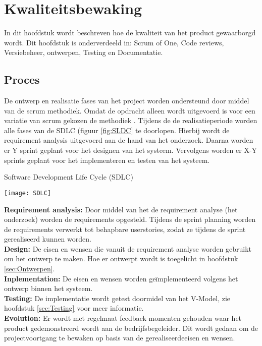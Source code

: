 \chapter{Kwaliteitsbewaking}
In dit hoofdstuk wordt beschreven hoe de kwaliteit van het product gewaarborgd wordt.
Dit hoofdstuk is onderverdeeld in: Scrum of One, Code reviews, Versiebeheer, ontwerpen, Testing en Documentatie.
\section{Proces}
De ontwerp en realisatie fases van het project worden ondersteund door middel van de scrum methodiek.
Omdat de opdracht alleen wordt uitgevoerd is voor een variatie van scrum gekozen de  methodiek \Parencite{ScrumOfOne}.
\whitespace
Tijdens de de realisatieperiode worden alle fases van de SDLC (figuur \ref{fig:SLDC} te doorlopen.
Hierbij wordt de requirement analysis uitgevoerd aan de hand van het onderzoek.
Daarna worden er Y sprint geplant voor het designen van het systeem.
Vervolgens worden er X-Y sprints geplant voor het implementeren en testen van het systeem. \\
\begin{graphic}
    \captionsetup{type=figure}
    \caption{Software Development Life Cycle (SDLC)}
    \texttt{[image: SDLC]}
    \label{fig:SLDC}
\end{graphic}
\whitespace
\textbf{Requirement analysis:} Door middel van het de requirement analyse (het onderzoek) worden de requirements opgesteld.
Tijdens de sprint planning worden de requirements verwerkt tot behapbare userstories, zodat ze tijdens de sprint gerealiseerd kunnen worden. \\
\textbf{Design:} De eisen en wensen die vanuit de requirement analyse worden gebruikt om het ontwerp te maken.
Hoe er ontwerpt wordt is toegelicht in hoofdstuk \ref{sec:Ontwerpen}.\\
\textbf{Inplementation:}
De eisen en wensen worden geïmplementeerd volgens het ontwerp binnen het systeem.\\
\textbf{Testing:} De implementatie wordt getest doormidel van het V-Model, zie hoofdstuk \ref{sec:Testing} voor meer informatie.\\
\textbf{Evolution:} Er wordt met regelmaat feedback momenten gehouden waar het product gedemonstreerd wordt aan de bedrijfsbegeleider.
Dit wordt gedaan om de projectvoortgang te bewaken op basis van de gerealiseerdeeisen en wensen.
